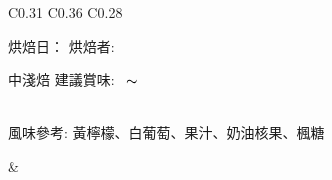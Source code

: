 \documentclass[10pt,a4paper]{article}
\begin{document}
\begin{tabular}{C{0.31\textwidth} C{0.36\textwidth} C{0.28\textwidth}}
{{\scriptsize 烘焙日：{\scriptsize\datedate}\hspace{0.3em}%
烘焙者: \textbf{\scriptsize{}}}\vspace*{-0.3em}\\
 \addtocounter{datenumber}{
5 }%
\setdatebynumber{\thedatenumber} 
{\normalsize 
中淺焙%
\enskip \scriptsize 建議賞味:} \scriptsize{\datemonthname ~\thedateday}$\thicksim$\addtocounter{datenumber}{55}\setdatebynumber{\thedatenumber} \datedate
\\\scriptsize 風味參考: 黃檸檬、白葡萄、果汁、奶油核果、楓糖
}& \shortstack[c]{
%
%
}
\end{tabular}
\end{document}
